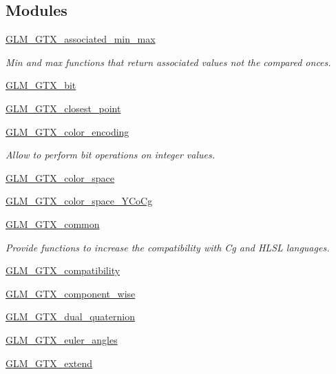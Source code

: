 \subsection*{Modules}
\begin{DoxyCompactItemize}
\item 
\hyperlink{group__gtx__associated__min__max}{G\+L\+M\+\_\+\+G\+T\+X\+\_\+associated\+\_\+min\+\_\+max}
\begin{DoxyCompactList}\small\item\em Min and max functions that return associated values not the compared onces. \end{DoxyCompactList}\item 
\hyperlink{group__gtx__bit}{G\+L\+M\+\_\+\+G\+T\+X\+\_\+bit}
\item 
\hyperlink{group__gtx__closest__point}{G\+L\+M\+\_\+\+G\+T\+X\+\_\+closest\+\_\+point}
\item 
\hyperlink{group__gtx__color__encoding}{G\+L\+M\+\_\+\+G\+T\+X\+\_\+color\+\_\+encoding}
\begin{DoxyCompactList}\small\item\em Allow to perform bit operations on integer values. \end{DoxyCompactList}\item 
\hyperlink{group__gtx__color__space}{G\+L\+M\+\_\+\+G\+T\+X\+\_\+color\+\_\+space}
\item 
\hyperlink{group__gtx__color__space__YCoCg}{G\+L\+M\+\_\+\+G\+T\+X\+\_\+color\+\_\+space\+\_\+\+Y\+Co\+Cg}
\item 
\hyperlink{group__gtx__common}{G\+L\+M\+\_\+\+G\+T\+X\+\_\+common}
\begin{DoxyCompactList}\small\item\em Provide functions to increase the compatibility with Cg and H\+L\+SL languages. \end{DoxyCompactList}\item 
\hyperlink{group__gtx__compatibility}{G\+L\+M\+\_\+\+G\+T\+X\+\_\+compatibility}
\item 
\hyperlink{group__gtx__component__wise}{G\+L\+M\+\_\+\+G\+T\+X\+\_\+component\+\_\+wise}
\item 
\hyperlink{group__gtx__dual__quaternion}{G\+L\+M\+\_\+\+G\+T\+X\+\_\+dual\+\_\+quaternion}
\item 
\hyperlink{group__gtx__euler__angles}{G\+L\+M\+\_\+\+G\+T\+X\+\_\+euler\+\_\+angles}
\item 
\hyperlink{group__gtx__extend}{G\+L\+M\+\_\+\+G\+T\+X\+\_\+extend}
\item 

\end{DoxyCompactItemize}

